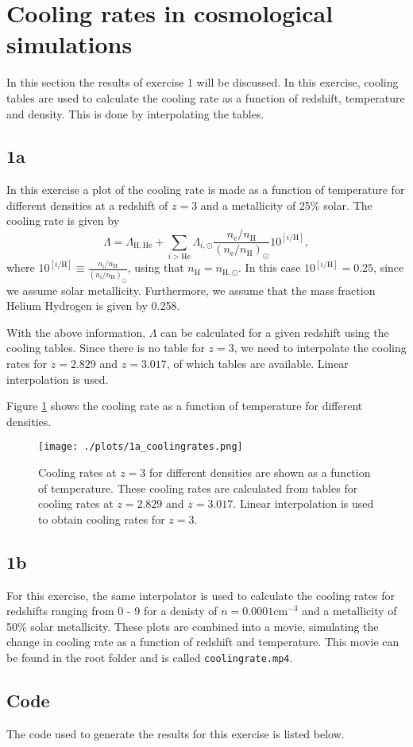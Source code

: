 
\section{Cooling rates in cosmological simulations}
In this section the results of exercise 1 will be discussed. In this exercise, cooling tables are used to calculate the cooling rate as a function of redshift, temperature and density. This is done by interpolating the tables.

\subsection*{1a}
In this exercise a plot of the cooling rate is made as a function of temperature for different densities at a redshift of $z=3$ and a metallicity of 25\% solar. The cooling rate is given by 
\begin{equation}
    \Lambda = \Lambda_{\mathrm{H},\mathrm{He}} + \sum_{i>\mathrm{He}} \Lambda_{i,\odot} \frac{n_\mathrm{e}/n_\mathrm{H}}{(n_\mathrm{e}/n_\mathrm{H})_\odot} 10^{[i/\mathrm{H}]},
\end{equation}
where $10^{[i/\mathrm{H}]} \equiv \frac{n_\mathrm{i}/n_\mathrm{H}}{(n_\mathrm{i}/n_\mathrm{H})_\odot}$, using that $n_\mathrm{H} = n_{\mathrm{H},\odot}$. In this case $10^{[i/\mathrm{H}]} = 0.25$, since we assume solar metallicity. Furthermore, we assume that the mass fraction Helium Hydrogen is given by 0.258.

With the above information, $\Lambda$ can be calculated for a given redshift using the cooling tables. Since there is no table for $z=3$, we need to interpolate the cooling rates for $z=2.829$ and $z=3.017$, of which tables are available. Linear interpolation is used.

Figure \ref{fig:coolingrates} shows the cooling rate as a function of temperature for different densities.

\begin{figure}[h!]
  \centering
  \texttt{[image: ./plots/1a\_coolingrates.png]}
  \caption{Cooling rates at $z=3$ for different densities are shown as a function of temperature. These cooling rates are calculated from tables for cooling rates at $z=2.829$ and $z=3.017$. Linear interpolation is used to obtain cooling rates for $z=3$.}
  \label{fig:coolingrates}
\end{figure}

\subsection*{1b}
For this exercise, the same interpolator is used to calculate the cooling rates for redshifts ranging from 0 - 9 for a denisty of $n = 0.0001 \mathrm{cm}^{−3}$ and a metallicity of 50\% solar metallicity. These plots are combined into a movie, simulating the change in cooling rate as a function of redshift and temperature. This movie can be found in the root folder and is called \texttt{coolingrate.mp4}.

\pagebreak

\subsection*{Code}
The code used to generate the results for this exercise is listed below.


\newpage